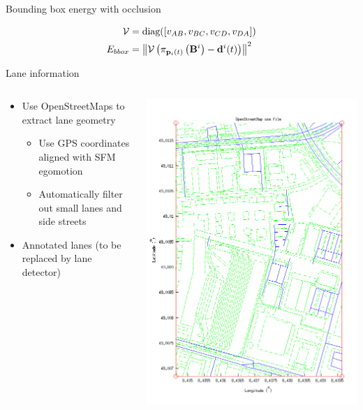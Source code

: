 \begin{frame}{Bounding box energy with occlusion}
  \centering
  
  \begin{align}
    \mathcal{V} &= \text{diag}([v_{AB}, v_{BC}, v_{CD}, v_{DA}])\\
    E_{bbox} &= \left\| \mathcal{V} \left(\pi_{\mathbf{p}_{i}({t})}\left(\mathbf{B}^{i}\right)-\mathbf{d}^{i}(t)\right) \right\|^2
  \end{align}
\end{frame}

\begin{frame}{Lane information}
  \begin{columns}[c]
    \begin{column}{0.5\textwidth}
      \begin{itemize}
        \item Use OpenStreetMaps to extract lane geometry
          \begin{itemize}
            \item Use GPS coordinates aligned with SFM egomotion
            \item Automatically filter out small lanes and side streets
          \end{itemize}
        \item Annotated lanes (to be replaced by lane detector)
      \end{itemize}
    \end{column}
    \begin{column}{0.5\textwidth}
      \includegraphics[width=\columnwidth]{graphics/mapimg.png}

\end{column}
\end{columns}
\end{frame}
